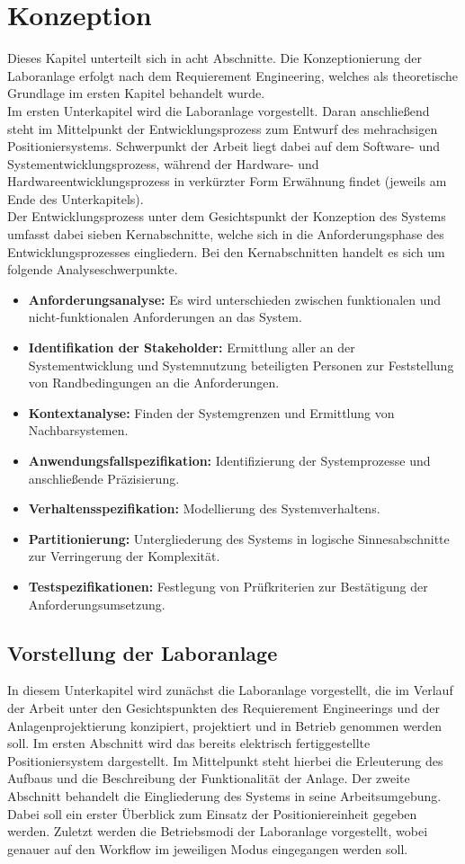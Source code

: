 \documentclass[../Bachelorarbeit.tex]{subfiles}
\begin{document}
\section{Konzeption}
Dieses Kapitel unterteilt sich in acht Abschnitte. Die Konzeptionierung der Laboranlage erfolgt nach dem Requierement Engineering, welches als theoretische Grundlage im ersten Kapitel behandelt wurde.\\
Im ersten Unterkapitel wird die Laboranlage vorgestellt. Daran anschließend steht im Mittelpunkt der Entwicklungsprozess zum Entwurf des mehrachsigen Positioniersystems. Schwerpunkt der Arbeit liegt dabei auf dem Software- und Systementwicklungsprozess, während der Hardware- und Hardwareentwicklungsprozess in verkürzter Form Erwähnung findet (jeweils am Ende des Unterkapitels).\\
Der Entwicklungsprozess unter dem Gesichtspunkt der Konzeption des Systems umfasst dabei sieben Kernabschnitte, welche sich in die Anforderungsphase des Entwicklungsprozesses eingliedern. Bei den Kernabschnitten handelt es sich um folgende Analyseschwerpunkte.\\
\begin{itemize}
    \item \textbf{Anforderungsanalyse:} Es wird unterschieden zwischen funktionalen und nicht-funktionalen Anforderungen an das System.
    \item \textbf{Identifikation der Stakeholder:} Ermittlung aller an der Systementwicklung und Systemnutzung beteiligten Personen zur Feststellung von Randbedingungen an die Anforderungen.
    \item \textbf{Kontextanalyse:} Finden der Systemgrenzen und Ermittlung von Nachbarsystemen.
    \item \textbf{Anwendungsfallspezifikation:} Identifizierung der Systemprozesse und anschließende Präzisierung.
    \item \textbf{Verhaltensspezifikation:} Modellierung des Systemverhaltens.
    \item \textbf{Partitionierung:} Untergliederung des Systems in logische Sinnesabschnitte zur Verringerung der Komplexität.
    \item \textbf{Testspezifikationen:} Festlegung von Prüfkriterien zur Bestätigung der Anforderungsumsetzung.
\end{itemize}
\subsection{Vorstellung der Laboranlage}
In diesem Unterkapitel wird zunächst die Laboranlage vorgestellt, die im Verlauf der Arbeit unter den Gesichtspunkten des Requierement Engineerings und der Anlagenprojektierung konzipiert, projektiert und in Betrieb genommen werden soll. Im ersten Abschnitt wird das bereits elektrisch fertiggestellte Positioniersystem dargestellt. Im Mittelpunkt steht hierbei die Erleuterung des Aufbaus und die Beschreibung der Funktionalität der Anlage. Der zweite Abschnitt behandelt die Eingliederung des Systems in seine Arbeitsumgebung. Dabei soll ein erster Überblick zum Einsatz der Positioniereinheit gegeben werden. Zuletzt werden die Betriebsmodi der Laboranlage vorgestellt, wobei genauer auf den Workflow im jeweiligen Modus eingegangen werden soll.
\end{document}
